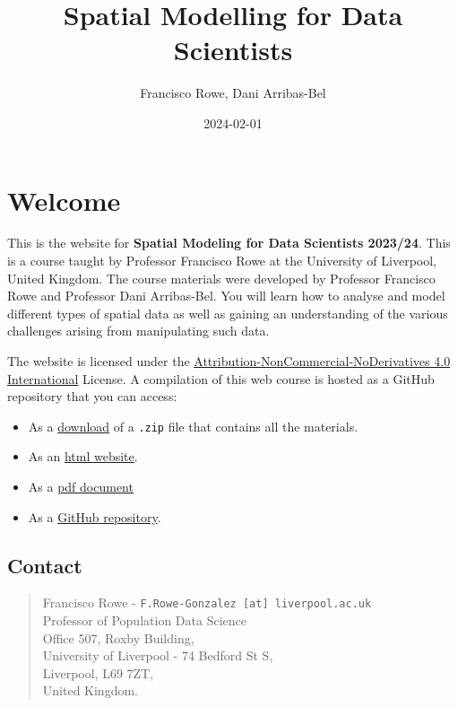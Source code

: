 \documentclass[
  letterpaper,
  DIV=11,
  numbers=noendperiod,
  oneside]{scrreprt}
\title{Spatial Modelling for Data Scientists}
\author{Francisco Rowe, Dani Arribas-Bel}
\date{2024-02-01}
\providecommand{\tightlist}{%
  \setlength{\itemsep}{0pt}\setlength{\parskip}{0pt}}\usepackage{longtable,booktabs,array}
\renewcommand*\contentsname{Table of contents}
\newcommand\contentsname{Table of contents}
\begin{document}
\maketitle

\renewcommand*\contentsname{Table of contents}
{
\hypersetup{linkcolor=}
\setcounter{tocdepth}{2}
\tableofcontents
}

\chapter*{Welcome}\label{welcome}


This is the website for \textbf{Spatial Modeling for Data Scientists
2023/24}. This is a course taught by Professor Francisco Rowe at the
University of Liverpool, United Kingdom. The course materials were
developed by Professor Francisco Rowe and Professor Dani Arribas-Bel.
You will learn how to analyse and model different types of spatial data
as well as gaining an understanding of the various challenges arising
from manipulating such data.

The website is licensed under the
\href{https://creativecommons.org/licenses/by-nc-nd/4.0/}{Attribution-NonCommercial-NoDerivatives
4.0 International} License. A compilation of this web course is hosted
as a GitHub repository that you can access:

\begin{itemize}
\tightlist
\item
  As a
  \href{https://github.com/GDSL-UL/san/archive/master.zip}{download} of
  a \texttt{.zip} file that contains all the materials.
\item
  As an \href{https://gdsl-ul.github.io/san/}{html website}.
\item
  As a
  \href{https://gdsl-ul.github.io/san/spatial_analysis_notes.pdf}{pdf
  document}
\item
  As a \href{https://github.com/GDSL-UL/san}{GitHub repository}.
\end{itemize}

\section*{Contact}\label{contact}


\begin{quote}
Francisco Rowe - \texttt{F.Rowe-Gonzalez\ {[}at{]}\ liverpool.ac.uk}\\
Professor of Population Data Science\\
Office 507, Roxby Building,\\
University of Liverpool - 74 Bedford St S,\\
Liverpool, L69 7ZT,\\
United Kingdom.
\end{quote}
\end{document}
